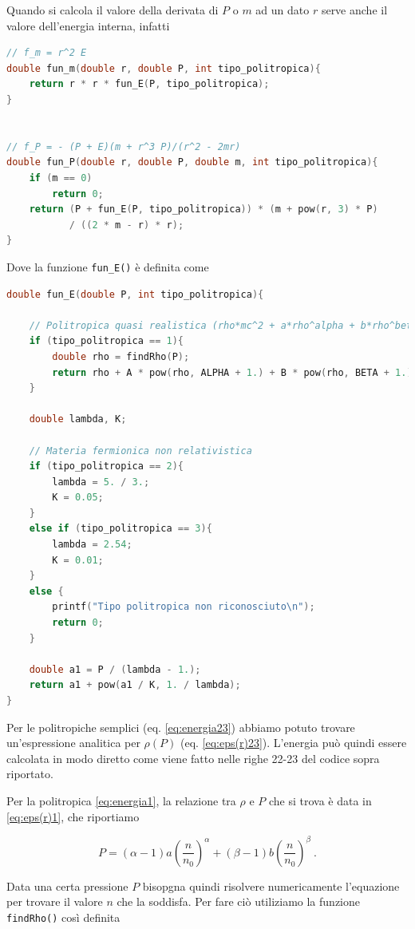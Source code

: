 \documentclass[a4paper, titlepage]{article}
\begin{document}
Quando si calcola il valore della derivata di $P$ o $m$ ad un dato $r$ serve
anche il valore dell'energia interna, infatti
\begin{lstlisting}[language=C]
// f_m = r^2 E
double fun_m(double r, double P, int tipo_politropica){
    return r * r * fun_E(P, tipo_politropica);
}


// f_P = - (P + E)(m + r^3 P)/(r^2 - 2mr)
double fun_P(double r, double P, double m, int tipo_politropica){
    if (m == 0)
        return 0;
    return (P + fun_E(P, tipo_politropica)) * (m + pow(r, 3) * P)
           / ((2 * m - r) * r);
}
\end{lstlisting}
Dove la funzione \texttt{fun\_E()} è definita come
\begin{lstlisting}[language=C]
double fun_E(double P, int tipo_politropica){

    // Politropica quasi realistica (rho*mc^2 + a*rho^alpha + b*rho^beta)
    if (tipo_politropica == 1){
        double rho = findRho(P);
        return rho + A * pow(rho, ALPHA + 1.) + B * pow(rho, BETA + 1.);
    }

    double lambda, K;

    // Materia fermionica non relativistica
    if (tipo_politropica == 2){
        lambda = 5. / 3.;
        K = 0.05;
    }
    else if (tipo_politropica == 3){
        lambda = 2.54;
        K = 0.01;
    }
    else {
        printf("Tipo politropica non riconosciuto\n");
        return 0;
    }

    double a1 = P / (lambda - 1.);
    return a1 + pow(a1 / K, 1. / lambda);
}
\end{lstlisting}

Per le politropiche semplici (eq. \ref{eq:energia23}) abbiamo potuto trovare
un'espressione analitica per $\rho (P)$ (eq. \ref{eq:eps(r)23}).
L'energia può quindi essere calcolata in modo diretto come viene fatto nelle
righe 22-23 del codice sopra riportato.

Per la politropica \ref{eq:energia1}, la relazione tra $\rho$ e $P$ che si trova
è data in \ref{eq:eps(r)1}, che riportiamo

\begin{equation}
        P = (\alpha - 1) a \left( \frac{n}{n_0} \right)^{\alpha}
        + (\beta - 1) b \left( \frac{n}{n_0} \right)^{\beta} \ .
        \label{ap:eq:1}
\end{equation}

Data una certa pressione $P$ bisopgna quindi risolvere numericamente l'equazione
per trovare il valore $n$ che la soddisfa.
Per fare ciò utiliziamo la funzione \texttt{findRho()} così definita
\end{document}
